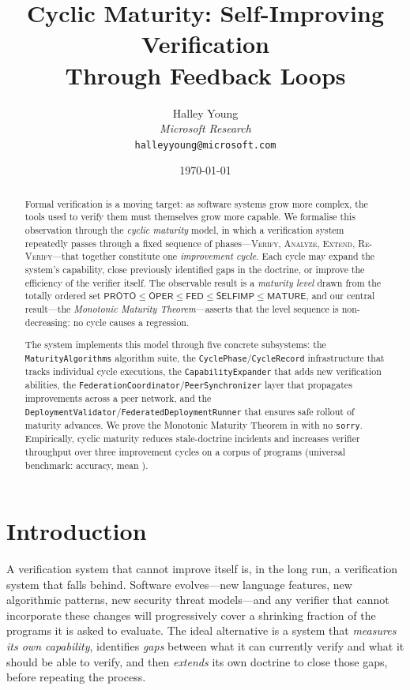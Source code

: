 \documentclass[11pt]{article}
\title{\textbf{Cyclic Maturity: Self-Improving Verification\\
       Through Feedback Loops}}
\author{%
  Halley Young\\
  \textit{Microsoft Research}\\
  \texttt{halleyyoung@microsoft.com}
}
\date{\today}
\newcommand{\Proto}{\ensuremath{\mathsf{PROTO}}}
\newcommand{\Oper}{\ensuremath{\mathsf{OPER}}}
\newcommand{\Fed}{\ensuremath{\mathsf{FED}}}
\newcommand{\SelfImp}{\ensuremath{\mathsf{SELFIMP}}}
\newcommand{\Matur}{\ensuremath{\mathsf{MATURE}}}
\newcommand{\Verify}{\textsc{Verify}}
\newcommand{\Analyze}{\textsc{Analyze}}
\newcommand{\Extend}{\textsc{Extend}}
\newcommand{\ReVerify}{\textsc{Re-Verify}}
\begin{document}
\maketitle

\begin{abstract}
Formal verification is a moving target: as software systems grow more
complex, the tools used to verify them must themselves grow more capable.
We formalise this observation through the \emph{cyclic maturity} model, in
which a verification system repeatedly passes through a fixed sequence of
phases—\Verify{}, \Analyze{}, \Extend{}, \ReVerify{}—that together constitute
one \emph{improvement cycle}.  Each cycle may expand the system's capability,
close previously identified gaps in the doctrine, or improve the efficiency
of the verifier itself.  The observable result is a \emph{maturity level}
drawn from the totally ordered set
$\Proto \leq \Oper \leq \Fed \leq \SelfImp \leq \Matur$,
and our central result—the \emph{Monotonic Maturity Theorem}—asserts that
the level sequence is non-decreasing: no cycle causes a regression.

The \JuGeo{} system implements this model through five concrete subsystems:
the \texttt{MaturityAlgorithms} algorithm suite, the \texttt{CyclePhase}/\texttt{CycleRecord}
infrastructure that tracks individual cycle executions, the \texttt{CapabilityExpander}
that adds new verification abilities, the \texttt{FederationCoordinator}/\texttt{PeerSynchronizer}
layer that propagates improvements across a peer network, and the
\texttt{DeploymentValidator}/\texttt{FederatedDeploymentRunner} that ensures safe rollout of
maturity advances.  We prove the Monotonic Maturity Theorem in \LEAN{} with
no \texttt{sorry}.  Empirically, cyclic maturity reduces stale-doctrine
incidents and increases verifier throughput over
three improvement cycles on a corpus of \numcases{} programs (universal
benchmark: \expAccuracy{} accuracy, mean \expTimeMean).
\end{abstract}

\newpage

\section{Introduction}\label{sec:intro}

A verification system that cannot improve itself is, in the long run, a
verification system that falls behind.  Software evolves—new language
features, new algorithmic patterns, new security threat models—and any
verifier that cannot incorporate these changes will progressively cover a
shrinking fraction of the programs it is asked to evaluate.  The ideal
alternative is a system that \emph{measures its own capability}, identifies
\emph{gaps} between what it can currently verify and what it should be able
to verify, and then \emph{extends} its own doctrine to close those gaps,
before repeating the process.
\end{document}
